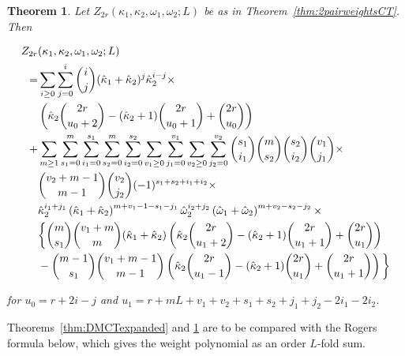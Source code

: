 \documentclass[11pt,a4paper]{article}
\newtheorem{theorem}{Theorem}
\newcommand{\ka}{\kappa}
\newcommand{\w}{\omega}
\begin{document}
\begin{theorem} \label{thm:twoWeightsPerWallExpansion} Let $Z_{2r}(\ka_1, \ka_2, \w_1, \w_2;L)$ be as in Theorem~\ref{thm:2pairweightsCT}.  Then
\begin{small}
\begin{align}
Z_{2r}&(\ka_1, \ka_2, \w_1, \w_2;L)\notag \\
=&\sum_{i\ge0} \sum_{j=0}^i \binom{i}{j} (\hat{\ka}_1 + \hat{\ka}_2)^j \hat{\ka}_2^{i-j} \times \notag \\
&\left ( \hat{\ka}_2 \binom{2r}{u_0+2} -(\hat{\ka}_2+1) \binom{2r}{u_0+1} + \binom{2r}{u_0}\right )\notag \\
+&\sum_{m \ge 1} 
\sum_{s_1=0}^m \sum_{i_1=0}^{s_1} \sum_{s_2=0}^m \sum_{i_2=0}^{s_2} \sum_{v_1 \ge 0} \sum_{j_1=0}^{v_1} \sum_{v_2 \ge 0} \sum_{j_2=0}^{v_2}
\binom{s_1}{i_1}\binom{m}{s_2}\binom{s_2}{i_2} 
\binom{v_1}{j_1} \times \notag \\
&\binom{v_2+m-1}{m-1}\binom{v_2}{j_2}(-1)^{s_1+s_2+i_1+i_2} \times\notag \\
&\hat{\ka}_2^{i_1+j_1}\left ( \hat{\ka}_1 + \hat{\ka}_2 \right )^{m+v_1-1-s_1-j_1}
\hat{\w}_2^{i_2+j_2}\left ( \hat{\w}_1 + \hat{\w}_2 \right )^{m+v_2-s_2-j_2}\times\notag \\
&{\bigg \{}
\binom{m}{s_1} \binom{v_1+m}{m}(\hat{\ka}_1 + \hat{\ka}_2)
\left ( \hat{\ka}_2\binom{2r}{u_1+2}-(\hat{\ka}_2+1)\binom{2r}{u_1+1}+\binom{2r}{u_1}\right )\notag \\
&-\binom{m-1}{s_1} \binom{v_1+m-1}{m-1} 
\left ( \hat{\ka}_2\binom{2r}{u_1-1}-{(\hat{\ka}_2+1)}\binom{2r}{u_1}+\binom{2r}{u_1+1}\right )
{\bigg \}} \label{eq:4weightsExpansion}
\end{align}
\end{small}

for $u_0=r+2i-j$ and $u_1 = r+mL+v_1+v_2+s_1+s_2+j_1+j_2-2i_1-2i_2$.
\end{theorem}

Theorems~\ref{thm:DMCTexpanded} and \ref{thm:twoWeightsPerWallExpansion} are to be compared with the Rogers formula below, which gives the weight polynomial as an order $L$-fold sum.
\end{document}
